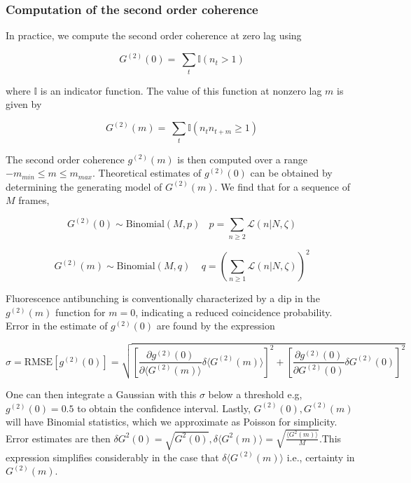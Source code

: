 \subsubsection{Computation of the second order coherence}

In practice, we compute the second order coherence at zero lag using

\begin{equation*}
G^{(2)}(0) =\ \sum_{t}{\mathbb{I}(n_t>1)}
\end{equation*}

where $\mathbb{I}$ is an indicator function. The value of this function at nonzero lag $m$ is given by

\begin{equation*}
G^{(2)}(m) =\ \sum_{t}{\mathbb{I}(n_t n_{t+m}\geq1)}
\end{equation*}

The second order coherence $g^{(2)}(m)$ is then computed over a range $-m_{min}\le m\le m_{max}$. Theoretical estimates of $g^{(2)}(0)$ can be obtained by determining the generating model of $G^{(2)}(m)$. We find that for a sequence of $M$ frames,

\begin{equation*}
G^{(2)}(0)\sim \mathrm{Binomial}(M,p)\ \ \ \ p=\sum_{n\geq2}{\mathcal{L}(n\lvert N,\zeta)}
\end{equation*}

\begin{equation*}
G^{(2)}(m)\sim \mathrm{Binomial}\left(M,q\right)\ \ \ \ \ q=\left(\sum_{n\geq1}{\mathcal{L}(n\lvert N,\zeta)}\right)^2
\end{equation*}

Fluorescence antibunching is conventionally characterized by a dip in the $g^{(2)}(m)$ function for $m=0$, indicating a reduced coincidence probability. Error in the estimate of $g^{(2)}(0)$ are found by the expression


\begin{equation}
\sigma = \text{RMSE}[g^{(2)}(0)] = \sqrt{
    \left[
    \frac{\partial g^{(2)}(0)}{\partial \langle G^{(2)}(m) \rangle} \delta \langle G^{(2)}(m) \rangle
    \right]^2 +
    \left[
    \frac{\partial g^{(2)}(0)}{\partial G^{(2)}(0)} \delta G^{(2)}(0)
    \right]^2
}
\end{equation}

One can then integrate a Gaussian with this $\sigma$ below a threshold e.g, $g^{(2)}(0)=0.5$ to obtain the confidence interval. Lastly, $G^{(2)}(0),G^{(2)}(m)$ will have Binomial statistics, which we approximate as Poisson for simplicity. Error estimates are then $\delta G^2(0) = \sqrt{G^2(0)}, \delta \langle G^2(m)\rangle = \sqrt{\frac{\langle G^2(m)\rangle}{M}}$.This expression simplifies considerably in the case that $\delta \langle G^{(2)}(m)\rangle$ i.e., certainty in $G^{(2)}(m)$. 


